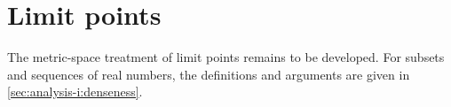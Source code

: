 \section{Limit points}
\label{sec:analysis-i:limit-points}

The metric-space treatment of limit points remains
to be developed. For subsets and sequences of real numbers, the
definitions and arguments are given in \autoref{sec:analysis-i:denseness}.

